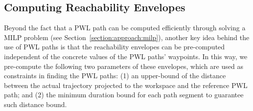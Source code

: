\documentclass[letterpaper]{article} %
\theoremstyle{definition}
\begin{document}


 
 

\subsection{Computing Reachability Envelopes}\label{section:approach:reachability}

Beyond the fact that a PWL path can be computed efficiently through solving a MILP problem (see Section~\ref{section:approach:milp}), another key idea behind the use of PWL paths is that the reachability envelopes can be pre-computed independent of the concrete values of the PWL paths' waypoints. In this way, we pre-compute the following two parameters of these envelopes, which are used as constraints in finding the PWL paths: (1) an upper-bound of the distance between the actual trajectory projected to the workspace and the reference PWL path; and (2) the minimum duration bound for each path segment to guarantee such distance bound.
\end{document}
